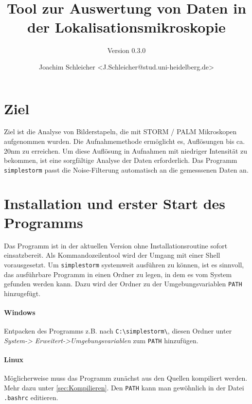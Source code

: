 \documentclass[DIV12,a4paper]{scrartcl}
\begin{document}
\title{Tool zur Auswertung von Daten in der Lokalisationsmikroskopie}
\subtitle{Version 0.3.0}
\author{Joachim Schleicher <J.Schleicher@stud.uni-heidelberg.de>}
\maketitle

\section{Ziel}
Ziel ist die Analyse von Bilderstapeln, die mit STORM / PALM Mikroskopen 
aufgenommen wurden.
Die Aufnahmemethode ermöglicht es, Auflösungen bis ca. 20nm zu erreichen.
Um diese Auflösung in Aufnahmen mit niedriger Intensität zu bekommen, ist
eine sorgfältige Analyse der Daten erforderlich.
Das Programm \texttt{simplestorm} passt die Noise-Filterung automatisch an 
die gemesssenen Daten an. 

\section{Installation und erster Start des Programms}
Das Programm ist in der aktuellen Version ohne Installationsroutine sofort einsatzbereit.
Als Kommandozeilentool wird der Umgang mit einer Shell vorausgesetzt.
Um \texttt{simplestorm} systemweit ausführen zu können, ist es sinnvoll, 
das ausführbare Programm 
in einen Ordner zu legen, in dem es vom System gefunden werden kann.
Dazu wird der Ordner zu der Umgebungsvariablen \texttt{PATH} hinzugefügt.

\paragraph{Windows} 
Entpacken des Programms z.B. nach \texttt{C:\textbackslash simplestorm\textbackslash}, 
diesen Ordner unter \emph{System-> Erweitert->Umgebungsvariablen} zum \texttt{PATH} 
hinzufügen.

\paragraph{Linux} %
Möglicherweise muss das Programm zunächst aus den Quellen kompiliert werden.
Mehr dazu unter \ref{sec:Kompilieren}.
Den \texttt{PATH} kann man gewöhnlich in der Datei \texttt{.bashrc} editieren.
\end{document}
